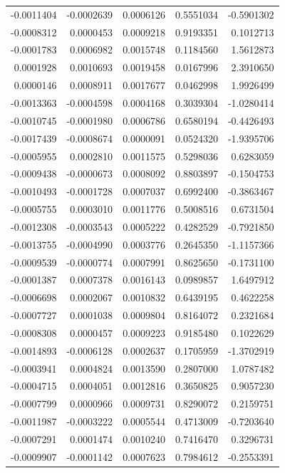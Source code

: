 \documentclass[]{tufte-handout}
\begin{document}
\begin{longtable}[]{@{}rrrrr@{}}
-0.0011404 & -0.0002639 & 0.0006126 & 0.5551034 & -0.5901302 \\
-0.0008312 & 0.0000453 & 0.0009218 & 0.9193351 & 0.1012713 \\
-0.0001783 & 0.0006982 & 0.0015748 & 0.1184560 & 1.5612873 \\
0.0001928 & 0.0010693 & 0.0019458 & 0.0167996 & 2.3910650 \\
0.0000146 & 0.0008911 & 0.0017677 & 0.0462998 & 1.9926499 \\
-0.0013363 & -0.0004598 & 0.0004168 & 0.3039304 & -1.0280414 \\
-0.0010745 & -0.0001980 & 0.0006786 & 0.6580194 & -0.4426493 \\
-0.0017439 & -0.0008674 & 0.0000091 & 0.0524320 & -1.9395706 \\
-0.0005955 & 0.0002810 & 0.0011575 & 0.5298036 & 0.6283059 \\
-0.0009438 & -0.0000673 & 0.0008092 & 0.8803897 & -0.1504753 \\
-0.0010493 & -0.0001728 & 0.0007037 & 0.6992400 & -0.3863467 \\
-0.0005755 & 0.0003010 & 0.0011776 & 0.5008516 & 0.6731504 \\
-0.0012308 & -0.0003543 & 0.0005222 & 0.4282529 & -0.7921850 \\
-0.0013755 & -0.0004990 & 0.0003776 & 0.2645350 & -1.1157366 \\
-0.0009539 & -0.0000774 & 0.0007991 & 0.8625650 & -0.1731100 \\
-0.0001387 & 0.0007378 & 0.0016143 & 0.0989857 & 1.6497912 \\
-0.0006698 & 0.0002067 & 0.0010832 & 0.6439195 & 0.4622258 \\
-0.0007727 & 0.0001038 & 0.0009804 & 0.8164072 & 0.2321684 \\
-0.0008308 & 0.0000457 & 0.0009223 & 0.9185480 & 0.1022629 \\
-0.0014893 & -0.0006128 & 0.0002637 & 0.1705959 & -1.3702919 \\
-0.0003941 & 0.0004824 & 0.0013590 & 0.2807000 & 1.0787482 \\
-0.0004715 & 0.0004051 & 0.0012816 & 0.3650825 & 0.9057230 \\
-0.0007799 & 0.0000966 & 0.0009731 & 0.8290072 & 0.2159751 \\
-0.0011987 & -0.0003222 & 0.0005544 & 0.4713009 & -0.7203640 \\
-0.0007291 & 0.0001474 & 0.0010240 & 0.7416470 & 0.3296731 \\
-0.0009907 & -0.0001142 & 0.0007623 & 0.7984612 & -0.2553391 \\

\end{longtable}
\end{document}
